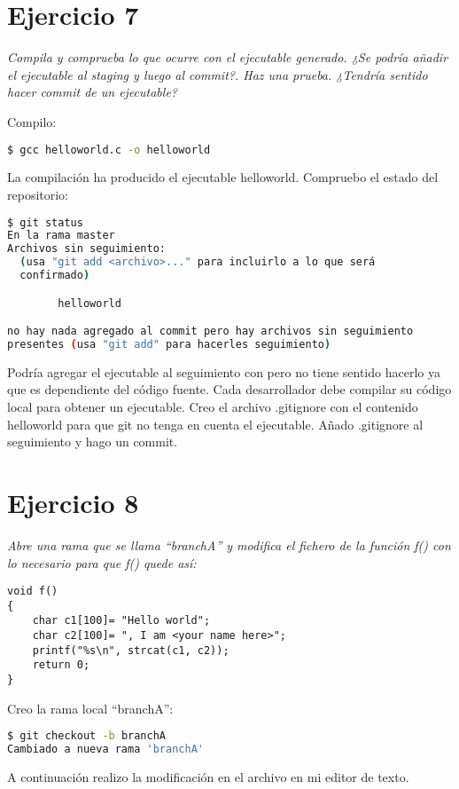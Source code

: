 \section{Ejercicio 7}
\begin{center}
    \parbox{12cm}{\justify\textit{
        Compila y comprueba lo que ocurre con el ejecutable generado. ¿Se podría añadir el ejecutable al staging y luego al commit?. Haz una prueba. ¿Tendría sentido hacer commit de un ejecutable?
    }}
\end{center}

Compilo:
\begin{lstlisting}[xleftmargin=.16\textwidth,language=bash]
$ gcc helloworld.c -o helloworld
\end{lstlisting}

La compilación ha producido el ejecutable helloworld. Compruebo el estado del repositorio:
\begin{lstlisting}[xleftmargin=.16\textwidth,language=bash]
$ git status
En la rama master
Archivos sin seguimiento:
  (usa "git add <archivo>..." para incluirlo a lo que será
  confirmado)

        helloworld

no hay nada agregado al commit pero hay archivos sin seguimiento
presentes (usa "git add" para hacerles seguimiento)
\end{lstlisting}

Podría agregar el ejecutable al seguimiento con  pero no tiene sentido hacerlo ya que es dependiente del código fuente. Cada desarrollador debe compilar su código local para obtener un ejecutable.
Creo el archivo .gitignore con el contenido helloworld para que git no tenga en cuenta el ejecutable. Añado .gitignore al seguimiento y hago un commit.

\section{Ejercicio 8}
\begin{center}
    \parbox{12cm}{\justify\textit{
        Abre una rama que se llama ``branchA'' y modifica el fichero de la función f() con lo necesario para que f() quede así:
    }}
\begin{lstlisting}[style=CStyle,xleftmargin=.3\textwidth]
void f()
{
    char c1[100]= "Hello world";
    char c2[100]= ", I am <your name here>";
    printf("%s\n", strcat(c1, c2));
    return 0;
}\end{lstlisting}
\end{center}
Creo la rama local ``branchA'':
\begin{lstlisting}[xleftmargin=.16\textwidth,language=bash]
$ git checkout -b branchA
Cambiado a nueva rama 'branchA'
\end{lstlisting}
A continuación realizo la modificación en el archivo en mi editor de texto.

